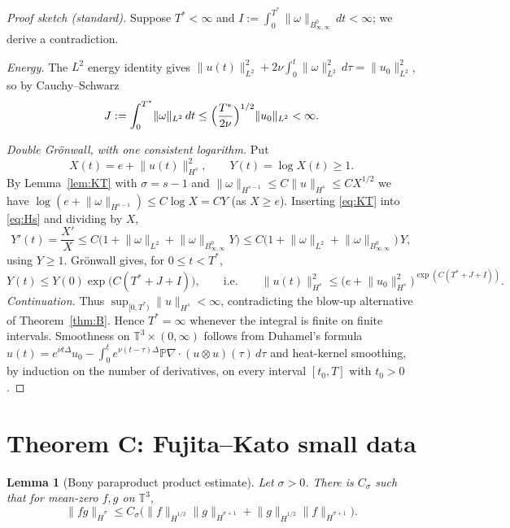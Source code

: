 \documentclass[11pt,reqno]{amsart}
\newtheorem{lemma}{Lemma}[section]
\theoremstyle{definition}
\theoremstyle{remark}
\newcommand{\T}{\mathbb{T}^3}
\newcommand{\Bz}{B^0_{\infty,\infty}}
\newcommand{\dH}[1]{\dot H^{#1}}
\newcommand{\norm}[1]{\lVert #1\rVert}
\begin{document}
\begin{proof}[Proof sketch (standard)]
Suppose $T^*<\infty$ and $I:=\int_0^{T^*}\norm{\omega}_{\Bz}\,dt<\infty$; we derive a contradiction.

\emph{Energy.} The $L^2$ energy identity gives $\norm{u(t)}_{L^2}^2+2\nu\int_0^t\norm{\omega}_{L^2}^2\,d\tau=\norm{u_0}_{L^2}^2$, so by Cauchy--Schwarz
\[
J:=\int_0^{T^*}\norm{\omega}_{L^2}\,dt\le\Bigl(\frac{T^*}{2\nu}\Bigr)^{1/2}\norm{u_0}_{L^2}<\infty .
\]

\emph{Double Gr\"onwall, with one consistent logarithm.} Put
\[
X(t)=e+\norm{u(t)}_{H^s}^2,\qquad Y(t)=\log X(t)\ge1 .
\]
By Lemma~\ref{lem:KT} with $\sigma=s-1$ and $\norm{\omega}_{H^{s-1}}\le C\norm{u}_{H^s}\le CX^{1/2}$ we have $\log(e+\norm{\omega}_{H^{s-1}})\le C\log X=CY$ (as $X\ge e$). Inserting \eqref{eq:KT} into \eqref{eq:Hs} and dividing by $X$,
\[
Y'(t)=\frac{X'}{X}\le C\bigl(1+\norm{\omega}_{L^2}+\norm{\omega}_{\Bz}Y\bigr)\le C\bigl(1+\norm{\omega}_{L^2}+\norm{\omega}_{\Bz}\bigr)\,Y,
\]
using $Y\ge1$. Gr\"onwall gives, for $0\le t<T^*$,
\[
Y(t)\le Y(0)\exp\bigl(C(T^*+J+I)\bigr),\qquad\text{i.e.}\qquad
\norm{u(t)}_{H^s}^2\le\bigl(e+\norm{u_0}_{H^s}^2\bigr)^{\exp(C(T^*+J+I))}.
\]
\emph{Continuation.} Thus $\sup_{[0,T^*)}\norm{u}_{H^s}<\infty$, contradicting the blow-up alternative of Theorem~\ref{thm:B}. Hence $T^*=\infty$ whenever the integral is finite on finite intervals. Smoothness on $\T\times(0,\infty)$ follows from Duhamel's formula $u(t)=e^{\nu t\Delta}u_0-\int_0^te^{\nu(t-\tau)\Delta}\mathbb P\nabla\cdot(u\otimes u)(\tau)\,d\tau$ and heat-kernel smoothing, by induction on the number of derivatives, on every interval $[t_0,T]$ with $t_0>0$.
\end{proof}

\section{Theorem C: Fujita--Kato small data}\label{sec:C}

\begin{lemma}[Bony paraproduct product estimate]\label{lem:Bony}
Let $\sigma>0$. There is $C_\sigma$ such that for mean-zero $f,g$ on $\T$,
\[
\norm{fg}_{\dH{\sigma}}\le C_\sigma\bigl(\norm{f}_{\dH{1/2}}\norm{g}_{\dH{\sigma+1}}+\norm{g}_{\dH{1/2}}\norm{f}_{\dH{\sigma+1}}\bigr).
\]
\end{lemma}
\end{document}
